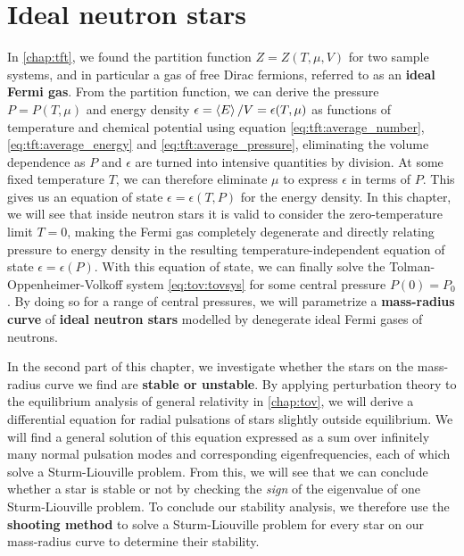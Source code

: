 \chapter{Ideal neutron stars}
\label{chap:nstars}


In \cref{chap:tft}, we found the partition function $Z = Z(T, \mu, V)$ for two sample systems, and in particular a gas of free Dirac fermions, referred to as an \textbf{ideal Fermi gas}.
From the partition function, we can derive the pressure $P = P(T, \mu)$ and energy density $\epsilon = \left< E \right>/V = \epsilon(T, \mu)$ as functions of temperature and chemical potential using equation \eqref{eq:tft:average_number}, \eqref{eq:tft:average_energy} and \eqref{eq:tft:average_pressure}, eliminating the volume dependence as $P$ and $\epsilon$ are turned into intensive quantities by division.
At some fixed temperature $T$, we can therefore eliminate $\mu$ to express $\epsilon$ in terms of $P$.
This gives us an equation of state $\epsilon = \epsilon(T, P)$ for the energy density.
In this chapter, we will see that inside neutron stars it is valid to consider the zero-temperature limit $T=0$, making the Fermi gas completely degenerate and directly relating pressure to energy density in the resulting temperature-independent equation of state $\epsilon = \epsilon(P)$.
With this equation of state, we can finally solve the Tolman-Oppenheimer-Volkoff system \eqref{eq:tov:tovsys} for some central pressure $P(0)=P_0$.
By doing so for a range of central pressures, we will parametrize a \textbf{mass-radius curve} of \textbf{ideal neutron stars} modelled by denegerate ideal Fermi gases of neutrons.

In the second part of this chapter, we investigate whether the stars on the mass-radius curve we find are \textbf{stable or unstable}.
By applying perturbation theory to the equilibrium analysis of general relativity in \cref{chap:tov}, we will derive a differential equation for radial pulsations of stars slightly outside equilibrium.
We will find a general solution of this equation expressed as a sum over infinitely many normal pulsation modes and corresponding eigenfrequencies, each of which solve a Sturm-Liouville problem.
From this, we will see that we can conclude whether a star is stable or not by checking the \emph{sign} of the eigenvalue of one Sturm-Liouville problem.
To conclude our stability analysis, we therefore use the \textbf{shooting method} to solve a Sturm-Liouville problem for every star on our mass-radius curve to determine their stability.

